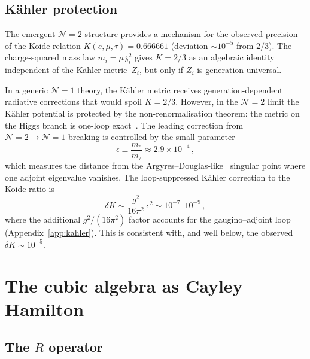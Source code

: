 \documentclass[aps,prd,twocolumn,showpacs,preprintnumbers,superscriptaddress,floatfix]{revtex4-2}
\newcommand{\zch}{\mathfrak{z}}
\begin{document}
\subsection{K\"ahler protection}

The emergent $\mathcal{N}{=}2$ structure provides a mechanism for
the observed precision of the Koide relation
$K(e,\mu,\tau) = 0.666661$ (deviation $\sim 10^{-5}$ from $2/3$).
The charge-squared mass law $m_i = \mu\,\zch_i^2$ gives
$K = 2/3$ as an algebraic identity independent of the K\"ahler
metric~$Z_i$, but only if $Z_i$ is generation-universal.

In a generic $\mathcal{N}{=}1$ theory, the K\"ahler metric
receives generation-dependent radiative corrections that would
spoil $K = 2/3$.
However, in the $\mathcal{N}{=}2$ limit the K\"ahler potential is
protected by the non-renormalisation theorem: the metric on the
Higgs branch is one-loop exact~\cite{SeibergWitten:1994a}.
The leading correction from $\mathcal{N}{=}2 \to \mathcal{N}{=}1$
breaking is controlled by the small parameter
\begin{equation}
  \epsilon
  \equiv \frac{m_e}{m_\tau}
  \approx 2.9 \times 10^{-4}\,,
\end{equation}
which measures the distance from the
Argyres--Douglas-like~\cite{ArgyresDouglas:1995} singular point
where one adjoint eigenvalue vanishes.
The loop-suppressed K\"ahler correction to the Koide ratio is
\begin{equation}
  \delta K
  \sim \frac{g^2}{16\pi^2}\,\epsilon^2
  \sim 10^{-7}\text{--}10^{-9}\,,
  \label{eq:deltaK}
\end{equation}
where the additional $g^2/(16\pi^2)$ factor accounts for the
gaugino--adjoint loop (Appendix~\ref{app:kahler}).
This is consistent with, and well below, the observed
$\delta K \sim 10^{-5}$.


\section{The cubic algebra as Cayley--Hamilton}
\label{sec:cubic}

\subsection{The $R$ operator}
\end{document}
